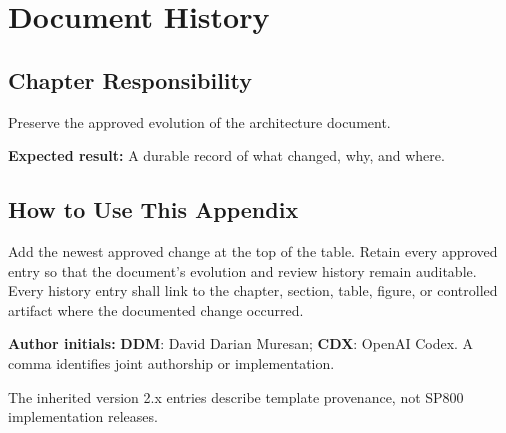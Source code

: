 \chapter{Document History}
\section{Chapter Responsibility}
\label{Section:DocumentHistoryResponsibility}
Preserve the approved evolution of the architecture document.

\noindent\textbf{Expected result:} A durable record of what changed, why, and where.

\section{How to Use This Appendix}
Add the newest approved change at the top of the table. Retain every approved
entry so that the document's evolution and review history remain auditable.
Every history entry shall link to the chapter, section, table, figure, or
controlled artifact where the documented change occurred.

\noindent\textbf{Author initials:} \textbf{DDM}: David Darian Muresan;
\textbf{CDX}: OpenAI Codex. A comma identifies joint authorship or implementation.

The inherited version 2.x entries describe template
provenance, not SP800 implementation releases.

